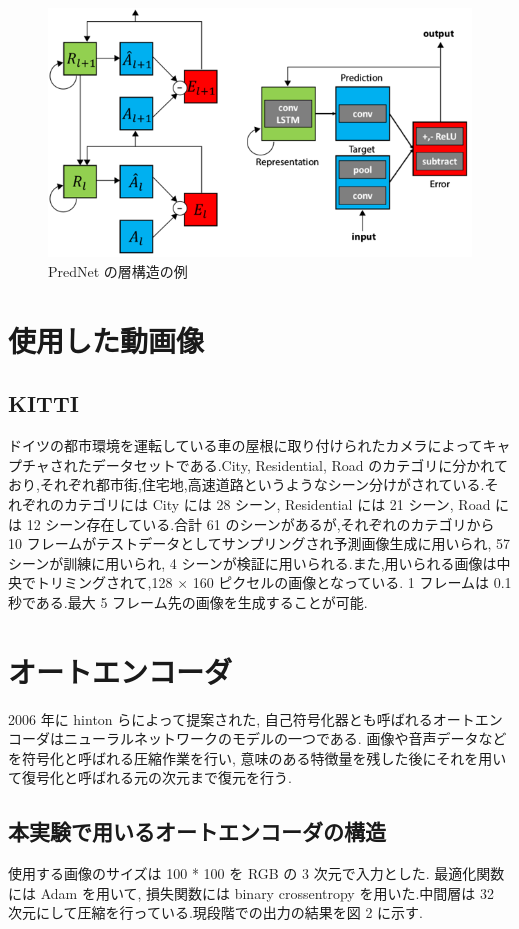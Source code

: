  \begin{figure}[hb]
\includegraphics[scale=0.4]{prednet.png}
 \caption{PredNet の層構造の例}
\end{figure}
\section{使用した動画像}
\subsection{KITTI}
ドイツの都市環境を運転している車の屋根に取り付けられたカメラによってキャプチャされたデータセットである.City, Residential, Road のカテゴリに分かれており,それぞれ都市街,住宅地,高速道路というようなシーン分けがされている.それぞれのカテゴリには City には 28 シーン, Residential には 21 シーン, Road には 12 シーン存在している.合計 61 のシーンがあるが,それぞれのカテゴリから 10 フレームがテストデータとしてサンプリングされ予測画像生成に用いられ, 57 シーンが訓練に用いられ, 4 シーンが検証に用いられる.また,用いられる画像は中央でトリミングされて,128 × 160 ピクセルの画像となっている. 1 フレームは 0.1 秒である.最大 5 フレーム先の画像を生成することが可能.

\section{オートエンコーダ}
2006 年に hinton らによって提案された, 自己符号化器とも呼ばれるオートエンコーダはニューラルネットワークのモデルの一つである. 画像や音声データなどを符号化と呼ばれる圧縮作業を行い, 意味のある特徴量を残した後にそれを用いて復号化と呼ばれる元の次元まで復元を行う.
\subsection{本実験で用いるオートエンコーダの構造}
使用する画像のサイズは 100 * 100 を RGB の 3 次元で入力とした. 最適化関数には Adam を用いて, 損失関数には binary crossentropy を用いた.中間層は 32 次元にして圧縮を行っている.現段階での出力の結果を図 2 に示す.

